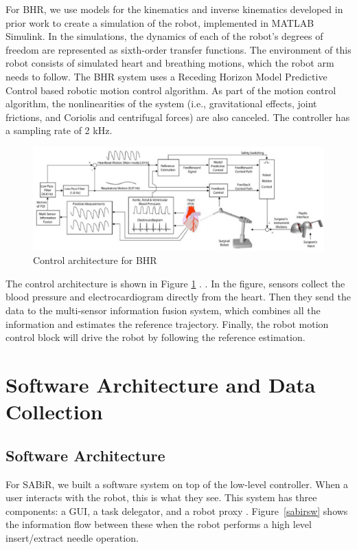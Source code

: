 For BHR, we use models for the kinematics and inverse kinematics developed in prior work \cite{bebek2007whisker} to create a simulation of the robot, implemented in MATLAB Simulink. In the simulations, the dynamics of each of the robot’s degrees of freedom are represented as sixth-order transfer functions. The environment of this robot consists of simulated heart and breathing motions, which the robot arm needs to follow. The BHR system uses a Receding Horizon Model Predictive Control based robotic motion control algorithm. As part of the motion control algorithm, the nonlinearities of the system (i.e., gravitational effects, joint frictions, and Coriolis and centrifugal forces) are also canceled. The controller has a sampling rate of 2 kHz. 

\begin{figure}[!thpb]
\centering
\includegraphics[width=\textwidth]{chapter5_BHR_control.pdf}
\caption{Control architecture for BHR}
\label{bhrcontrol}
\end{figure}

The control architecture is shown in Figure \ref{bhrcontrol} \cite{bebek2007whisker, tuna2013heart}. . In the figure, sensors collect the blood pressure and electrocardiogram directly from the heart. Then they send the data to the multi-sensor information fusion system, which combines all the information and estimates the reference trajectory. Finally, the robot motion control block will drive the robot by following the reference estimation.

\section{Software Architecture and Data Collection}\label{softwareframe}

\subsection{Software Architecture}
For SABiR, we built a software system on top of the low-level controller. When a user interacts with the robot, this is what they see.  This system has three components: a GUI, a task delegator, and a robot proxy \cite{liangframework}. Figure~\ref{sabirsw} shows the information flow between these when the robot performs a high level insert/extract needle operation.

